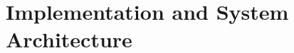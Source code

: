 \section{Implementation and System Architecture}



% 

\let\originalsection\section
\let\originalsubsection\subsection
\let\originalsubsubsection\subsubsection
\let\section\originalsubsection
\let\subsection\originalsubsubsection
\let\subsubsection\originalsubsubsection




\let\section\originalsection
\let\subsection\originalsubsection
\let\subsubsection\originalsubsubsection

